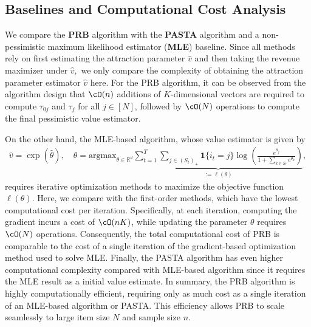 \documentclass[10pt, letterpaper]{article}
\begin{document}
\subsection{Baselines and Computational Cost Analysis}
 We
compare the \textbf{PRB} algorithm with the \textbf{PASTA} algorithm \citep{dong2023pasta} and a non-pessimistic maximum likelihood estimator (\textbf{MLE}) baseline. 
Since all methods rely on first estimating the attraction parameter $\widehat{v}$ and then taking the revenue maximizer under $\widehat{v},$ we only compare the complexity of obtaining the attraction parameter estimator $\widehat{v}$ here. For the PRB algorithm, it can be observed from the algorithm design that $\cO(n)$ additions of $K$-dimensional vectors are required to compute $\tau_{0j}$ and $\tau_j$ for all $j \in [N]$, followed by $\cO(N)$ operations to compute the final pessimistic value estimator. 

On the other hand, the MLE-based algorithm, whose value estimator is given by
\begin{align*}
\widehat{v} = \exp(\widehat{\theta}), \quad \widehat{\theta} = \text{argmax}_{\theta \in \mathbb{R}^d} \underbrace{\sum_{t = 1}^T \sum_{j \in (S_t)_+} \bm{1}\{i_t = j\} \log \left(\frac{e^{\theta_j}}{1 + \sum_{k \in S_t} e^{\theta_k}} \right)}_{:= \ell(\theta)},
\end{align*}
requires iterative optimization methods to maximize the objective function $\ell(\theta)$. Here, we compare with the first-order methods, which have the lowest computational cost per iteration. Specifically, at each iteration, computing the gradient incurs a cost of $\cO(nK)$, while updating the parameter $\theta$ requires $\cO(N)$ operations. Consequently, the total computational cost of PRB is comparable to the cost of a single iteration of the gradient-based optimization method used to solve MLE. Finally, the PASTA algorithm has even higher computational complexity compared with MLE-based algorithm since it requires the MLE result as a initial value estimate. In summary, the PRB algorithm is highly computationally efficient, requiring only as much cost as a single iteration of an MLE-based algorithm or PASTA. This efficiency allows PRB to scale seamlessly to large item size $N$ and sample size $n$.
\end{document}
